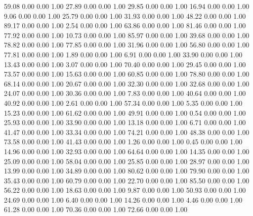    59.08   0.00   0.00   1.00
   27.89   0.00   0.00   1.00
   29.85   0.00   0.00   1.00
   16.94   0.00   0.00   1.00
    9.06   0.00   0.00   1.00
   25.79   0.00   0.00   1.00
   31.93   0.00   0.00   1.00
   48.22   0.00   0.00   1.00
   89.17   0.00   0.00   1.00
    2.54   0.00   0.00   1.00
   63.86   0.00   0.00   1.00
   81.46   0.00   0.00   1.00
   77.92   0.00   0.00   1.00
   10.73   0.00   0.00   1.00
   85.97   0.00   0.00   1.00
   39.68   0.00   0.00   1.00
   78.82   0.00   0.00   1.00
   77.85   0.00   0.00   1.00
   31.96   0.00   0.00   1.00
   56.80   0.00   0.00   1.00
   77.81   0.00   0.00   1.00
    1.89   0.00   0.00   1.00
    6.91   0.00   0.00   1.00
   33.90   0.00   0.00   1.00
   13.43   0.00   0.00   1.00
    3.07   0.00   0.00   1.00
   70.40   0.00   0.00   1.00
   29.45   0.00   0.00   1.00
   73.57   0.00   0.00   1.00
   15.63   0.00   0.00   1.00
   60.85   0.00   0.00   1.00
   78.80   0.00   0.00   1.00
   68.14   0.00   0.00   1.00
   20.67   0.00   0.00   1.00
   32.30   0.00   0.00   1.00
   32.68   0.00   0.00   1.00
   24.07   0.00   0.00   1.00
   30.36   0.00   0.00   1.00
    7.83   0.00   0.00   1.00
   40.64   0.00   0.00   1.00
   40.92   0.00   0.00   1.00
    2.61   0.00   0.00   1.00
   57.34   0.00   0.00   1.00
    5.35   0.00   0.00   1.00
   15.23   0.00   0.00   1.00
   61.62   0.00   0.00   1.00
   49.91   0.00   0.00   1.00
    0.54   0.00   0.00   1.00
   25.93   0.00   0.00   1.00
   33.90   0.00   0.00   1.00
   13.18   0.00   0.00   1.00
    6.71   0.00   0.00   1.00
   41.47   0.00   0.00   1.00
   33.34   0.00   0.00   1.00
   74.21   0.00   0.00   1.00
   48.38   0.00   0.00   1.00
   73.58   0.00   0.00   1.00
   41.43   0.00   0.00   1.00
    1.26   0.00   0.00   1.00
    0.45   0.00   0.00   1.00
   14.96   0.00   0.00   1.00
   32.93   0.00   0.00   1.00
   64.64   0.00   0.00   1.00
   14.35   0.00   0.00   1.00
   25.09   0.00   0.00   1.00
   58.04   0.00   0.00   1.00
   25.85   0.00   0.00   1.00
   28.97   0.00   0.00   1.00
   13.99   0.00   0.00   1.00
   34.89   0.00   0.00   1.00
   80.62   0.00   0.00   1.00
   79.90   0.00   0.00   1.00
   35.43   0.00   0.00   1.00
   60.79   0.00   0.00   1.00
   22.70   0.00   0.00   1.00
   85.50   0.00   0.00   1.00
   56.22   0.00   0.00   1.00
   18.63   0.00   0.00   1.00
    9.87   0.00   0.00   1.00
   50.93   0.00   0.00   1.00
   24.69   0.00   0.00   1.00
    6.40   0.00   0.00   1.00
   14.26   0.00   0.00   1.00
    4.46   0.00   0.00   1.00
   61.28   0.00   0.00   1.00
   70.36   0.00   0.00   1.00
   72.66   0.00   0.00   1.00
